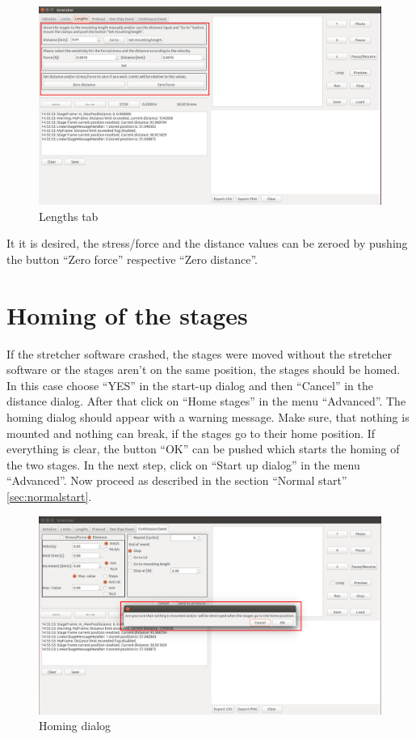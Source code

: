 \begin{figure}[!ht]
	\centering
		\includegraphics[width=1.0\textwidth]{images/Lengths}
	\caption{Lengths tab}
	\label{fig:lengths}
\end{figure}

It it is desired, the stress/force and the distance values can be zeroed by pushing the button ``Zero force'' respective ``Zero distance''.

\section{Homing of the stages}
If the stretcher software crashed, the stages were moved without the stretcher software or the stages aren't on the same position, the stages should be homed. In this case choose ``YES'' in the start-up dialog and then ``Cancel'' in the distance dialog. After that click on ``Home stages'' in the menu ``Advanced''. The homing dialog should appear with a warning message. Make sure, that nothing is mounted and nothing can break, if the stages go to their home position. If everything is clear, the button ``OK'' can be pushed which starts the homing of the two stages. In the next step, click on ``Start up dialog'' in the menu ``Advanced''. Now proceed as described in the section ``Normal start'' \ref{sec:normalstart}.

\begin{figure}[!ht]
	\centering
		\includegraphics[width=1.0\textwidth]{images/HomeStages}
	\caption{Homing dialog}
	\label{fig:homeing}
\end{figure}
